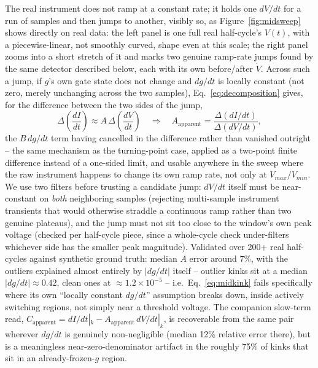 \documentclass[11pt]{article}
\begin{document}
The real instrument does not ramp at a constant rate; it holds one
$dV/dt$ for a run of samples and then jumps to another, visibly so, as
Figure~\ref{fig:midsweep} shows directly on real data: the left panel is
one full real half-cycle's $V(t)$, with a piecewise-linear, not smoothly
curved, shape even at this scale; the right panel zooms into a short
stretch of it and marks two genuine ramp-rate jumps found by the same
detector described below, each with its own before/after $\dot V$.
Across such a jump,
if $g$'s own gate state does not change and $dg/dt$ is locally constant
(not zero, merely unchanging across the two samples), Eq.~\eqref{eq:decomposition}
gives, for the difference between the two sides of the jump,
\begin{equation}
\Delta\!\left(\frac{dI}{dt}\right) \approx A\,\Delta\!\left(\frac{dV}{dt}\right)
\quad\Longrightarrow\quad
A_{\text{apparent}} = \frac{\Delta(dI/dt)}{\Delta(dV/dt)},
\label{eq:midkink}
\end{equation}
the $B\,dg/dt$ term having cancelled in the difference rather than vanished
outright -- the same mechanism as the turning-point case, applied as a
two-point finite difference instead of a one-sided limit, and usable
anywhere in the sweep where the raw instrument happens to change its own
ramp rate, not only at $V_{max}/V_{min}$. We use two filters before trusting
a candidate jump: $dV/dt$ itself must be near-constant on \emph{both}
neighboring samples (rejecting multi-sample instrument transients that
would otherwise straddle a continuous ramp rather than two genuine
plateaus), and the jump must not sit too close to the window's own peak
voltage (checked per half-cycle piece, since a whole-cycle check
under-filters whichever side has the smaller peak magnitude). Validated
over 200+ real half-cycles against synthetic ground truth: median $A$ error
around 7\%, with the outliers explained almost entirely by $|dg/dt|$ itself
-- outlier kinks sit at a median $|dg/dt| \approx 0.42$, clean ones at
$\approx 1.2\times10^{-5}$ -- i.e.\ Eq.~\eqref{eq:midkink} fails
specifically where its own ``locally constant $dg/dt$'' assumption breaks
down, inside actively switching regions, not simply near a threshold
voltage. The companion slow-term read, $C_{\text{apparent}} = dI/dt|_k -
A_{\text{apparent}}\,dV/dt|_k$, is recoverable from the same pair wherever
$dg/dt$ is genuinely non-negligible (median 12\% relative error there), but
is a meaningless near-zero-denominator artifact in the roughly 75\% of
kinks that sit in an already-frozen-$g$ region.
\end{document}
